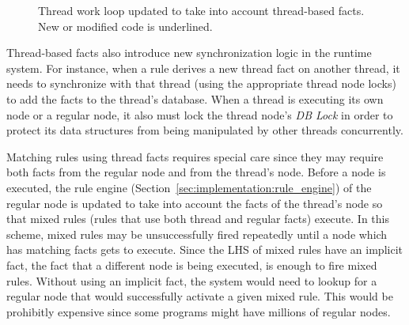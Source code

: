 \begin{figure}
\begin{algorithm}[H]
\end{algorithm}
\caption{Thread work loop updated to take into account thread-based facts.
New or modified code is underlined.}
\label{alg:threads:work_loop}
\end{figure}

Thread-based facts also introduce new synchronization logic in the runtime
system. For instance, when a rule derives a new thread fact on another thread,
it needs to synchronize with that thread (using the appropriate thread node
locks) to add the facts to the thread's database. When a thread is executing its
own node or a regular node, it also must lock the thread node's \emph{DB Lock}
in order to protect its data structures from being manipulated by other threads
concurrently.

Matching rules using thread facts requires special care since they may require
both facts from the regular node and from the thread's node. Before a node is
executed, the rule engine (Section~\ref{sec:implementation:rule_engine}) of the
regular node is updated to take into account the facts of the thread's node so
that mixed rules (rules that use both thread and regular facts) execute. In this
scheme, mixed rules may be unsuccessfully fired repeatedly until a node which
has matching facts gets to execute.  Since the LHS of mixed rules have an
implicit  fact, the fact that a different node is being
executed, is enough to fire mixed rules. Without using an implicit
 fact, the system would need to lookup for a regular node that
would successfully activate a given mixed rule. This would be prohibitly
expensive since some programs might have millions of regular nodes.
